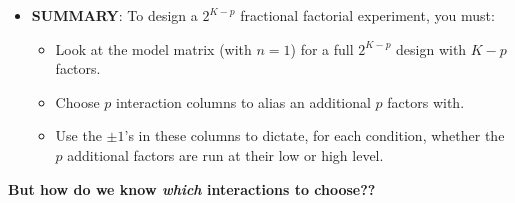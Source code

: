 \begin{itemize}
    \item \textbf{SUMMARY}: To design a $ 2^{K-p} $ fractional factorial experiment, you must:
          \begin{itemize}[*]
              \item Look at the model matrix (with $ n=1 $) for a full $ 2^{K-p} $ design with $ K-p $ factors.
              \item Choose $ p $ interaction columns to alias an additional $ p $ factors with.
              \item Use the $ \pm 1 $'s in these columns to dictate, for each condition, whether the $p$ additional factors are
                    run at their low or high level.
          \end{itemize}
\end{itemize}
\begin{framed}
    \begin{tightcenter}
        \textbf{But how do we know \emph{which} interactions to choose??}
    \end{tightcenter}
\end{framed}
